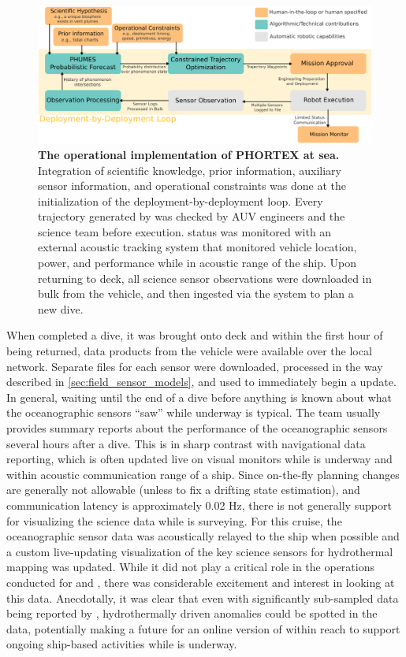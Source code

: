 \begin{figure}[h!]
    \centering
    \includegraphics[width=1.0\columnwidth]{figures/deployment_loop.png}
    \caption[The operational implementation of \PHORTEX at sea.]{\textbf{The operational implementation of PHORTEX at sea.} Integration of scientific knowledge, prior information, auxiliary sensor information, and operational constraints was done at the initialization of the \PHORTEX deployment-by-deployment loop. Every trajectory generated by \PHORTEX was checked by AUV \Sentry engineers and the science team before execution. \Sentry status was monitored with an external acoustic tracking system that monitored vehicle location, power, and performance while in acoustic range of the ship. Upon returning to deck, all science sensor observations were downloaded in bulk from the vehicle, and then ingested via the \PHORTEX system to plan a new dive.}
    \label{fig:at_sea_ops}
\end{figure}

When \Sentry completed a dive, it was brought onto deck and within the first hour of being returned, data products from the vehicle were available over the \Sentry local network. Separate files for each sensor were downloaded, processed in the way described in \cref{sec:field_sensor_models}, and used to immediately begin a \PHUMES update. In general, waiting until the end of a dive before anything is known about what the oceanographic sensors ``saw'' while underway is typical. The \Sentry team usually provides summary reports about the performance of the oceanographic sensors several hours after a dive. This is in sharp contrast with navigational data reporting, which is often updated live on visual monitors while \Sentry is underway and within acoustic communication range of a ship. Since on-the-fly planning changes are generally not allowable (unless to fix a drifting \Sentry state estimation), and communication latency is approximately 0.02 Hz, there is not generally support for visualizing the science data while \Sentry is surveying. For this cruise, the oceanographic sensor data was acoustically relayed to the ship when possible and a custom live-updating visualization of the key science sensors for hydrothermal mapping was updated. While it did not play a critical role in the operations conducted for \PHUMES and \PHORTEX, there was considerable excitement and interest in looking at this data. Anecdotally, it was clear that even with significantly sub-sampled data being reported by \Sentry, hydrothermally driven anomalies could be spotted in the data, potentially making a future for an online version of \PHUMES within reach to support ongoing ship-based activities while \Sentry is underway. 


